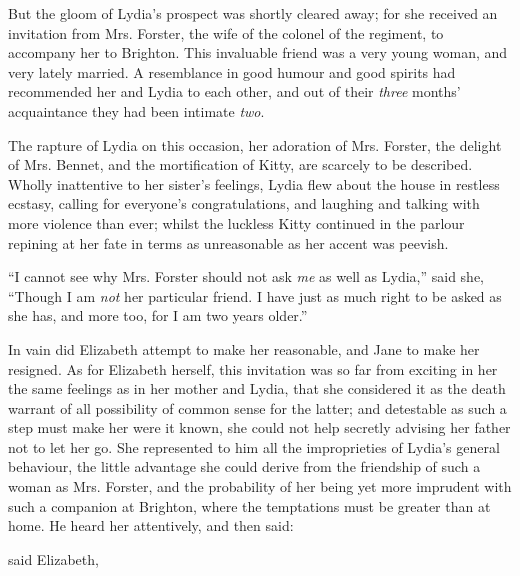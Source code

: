 But the gloom of Lydia's prospect was shortly cleared away; for she received an invitation from Mrs. Forster, the wife of the colonel of the regiment, to accompany her to Brighton. This invaluable friend was a very young woman, and very lately married. A resemblance in good humour and good spirits had recommended her and Lydia to each other, and out of their {\em three} months' acquaintance they had been intimate {\em two}.

The rapture of Lydia on this occasion, her adoration of Mrs. Forster, the delight of Mrs. Bennet, and the mortification of Kitty, are scarcely to be described. Wholly inattentive to her sister's feelings, Lydia flew about the house in restless ecstasy, calling for everyone's congratulations, and laughing and talking with more violence than ever; whilst the luckless Kitty continued in the parlour repining at her fate in terms as unreasonable as her accent was peevish.

“I cannot see why Mrs. Forster should not ask {\em me} as well as Lydia,” said she, “Though I am {\em not} her particular friend. I have just as much right to be asked as she has, and more too, for I am two years older.”

In vain did Elizabeth attempt to make her reasonable, and Jane to make her resigned. As for Elizabeth herself, this invitation was so far from exciting in her the same feelings as in her mother and Lydia, that she considered it as the death warrant of all possibility of common sense for the latter; and detestable as such a step must make her were it known, she could not help secretly advising her father not to let her go. She represented to him all the improprieties of Lydia's general behaviour, the little advantage she could derive from the friendship of such a woman as Mrs. Forster, and the probability of her being yet more imprudent with such a companion at Brighton, where the temptations must be greater than at home. He heard her attentively, and then said:


 said Elizabeth, 

